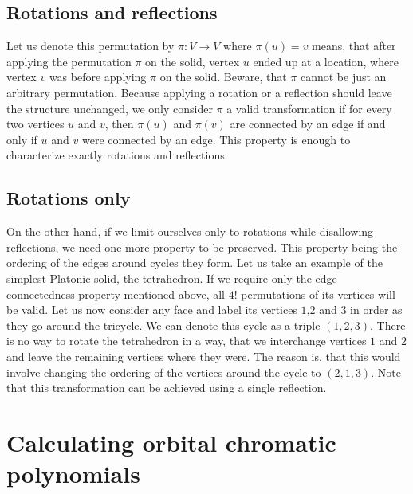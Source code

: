 \subsection{Rotations and reflections}

Let us denote this permutation by $\pi : V \rightarrow V$ where $\pi(u) = v$ means, that after applying the permutation $\pi$ on the solid, vertex $u$ ended up at a location, where vertex $v$ was before applying $\pi$ on the solid. Beware, that $\pi$ cannot be just an arbitrary permutation. Because applying a rotation or a reflection should leave the structure unchanged, we only consider $\pi$ a valid transformation if for every two vertices $u$ and $v$, then $\pi(u)$ and $\pi(v)$ are connected by an edge if and only if $u$ and $v$ were connected by an edge. This property is enough to characterize exactly rotations and reflections.

\subsection{Rotations only}

On the other hand, if we limit ourselves only to rotations while disallowing reflections, we need one more property to be preserved. This property being the ordering of the edges around cycles they form. Let us take an example of the simplest Platonic solid, the tetrahedron. If we require only the edge connectedness property mentioned above, all $4!$ permutations of its vertices will be valid. Let us now consider any face and label its vertices $1$,$2$ and $3$ in order as they go around the tricycle. We can denote this cycle as a triple $(1,2,3)$. There is no way to rotate the tetrahedron in a way, that we interchange vertices $1$ and $2$ and leave the remaining vertices where they were. The reason is, that this would involve changing the ordering of the vertices around the cycle to $(2,1,3)$. Note that this transformation can be achieved using a single reflection.

\section{Calculating orbital chromatic polynomials}

